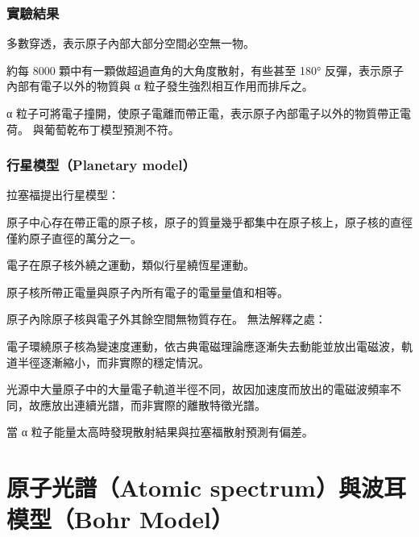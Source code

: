 \documentclass[a4paper,12pt]{report}
\begin{document}
\subsubsection{實驗結果}
\bit
\item 多數穿透，表示原子內部大部分空間必空無一物。
\item 約每 8000 顆中有一顆做超過直角的大角度散射，有些甚至 180° 反彈，表示原子內部有電子以外的物質與 α 粒子發生強烈相互作用而排斥之。
\item α 粒子可將電子撞開，使原子電離而帶正電，表示原子內部電子以外的物質帶正電荷。
\eit
與葡萄乾布丁模型預測不符。
\subsubsection{行星模型（Planetary model）}
拉塞福提出行星模型：
\bit
\item 原子中心存在帶正電的原子核，原子的質量幾乎都集中在原子核上，原子核的直徑僅約原子直徑的萬分之一。
\item 電子在原子核外繞之運動，類似行星繞恆星運動。
\item 原子核所帶正電量與原子內所有電子的電量量值和相等。
\item 原子內除原子核與電子外其餘空間無物質存在。
\eit
無法解釋之處：
\bit
\item 電子環繞原子核為變速度運動，依古典電磁理論應逐漸失去動能並放出電磁波，軌道半徑逐漸縮小，而非實際的穩定情況。
\item 光源中大量原子中的大量電子軌道半徑不同，故因加速度而放出的電磁波頻率不同，故應放出連續光譜，而非實際的離散特徵光譜。
\item 當 α 粒子能量太高時發現散射結果與拉塞福散射預測有偏差。
\eit


\section{原子光譜（Atomic spectrum）與波耳模型（Bohr Model）}
\end{document}
